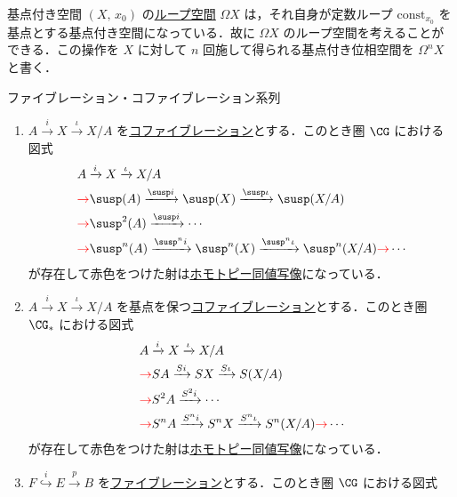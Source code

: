 \documentclass[algtopo_main]{subfiles}
\begin{document}
基点付き空間 $(X,\, x_0)$ の\hyperref[def:path-loop]{ループ空間} $\Omega X$ は，それ自身が定数ループ $\mathrm{const}_{x_0}$ を基点とする基点付き空間になっている．故に $\Omega X$ のループ空間を考えることができる．この操作を $X$ に対して $n$ 回施して得られる基点付き位相空間を $\Omega^n X$ と書く．

\begin{mytheo}[label=thm:fib-seq, breakable]{ファイブレーション・コファイブレーション系列}
    \begin{enumerate}
        \item $A \xrightarrow{i} X \xrightarrow{\iota} X/A$ を\hyperref[def:cofibration]{コファイブレーション}とする．このとき圏 $\CG$ における図式
        \begin{align}
            &A \xrightarrow{i} X \xrightarrow{\iota} X/A \\
            &\textcolor{red}{\to} \susp(A)  \xrightarrow{\susp i} \susp(X) \xrightarrow{\susp \iota} \susp (X/A) \\
            &\textcolor{red}{\to} \susp^2(A) \xrightarrow{\susp i} \cdots \\
            &\textcolor{red}{\to} \susp^n (A) \xrightarrow{\susp^n i} \susp^n (X) \xrightarrow{\susp^n \iota} \susp^n (X/A) \textcolor{red}{\to} \cdots 
        \end{align}
        が存在して赤色をつけた射は\hyperref[def:homotopy-basic]{ホモトピー同値写像}になっている．
        \item $A \xrightarrow{i} X \xrightarrow{\iota} X/A$ を基点を保つ\hyperref[def:cofibration]{コファイブレーション}とする．このとき圏 $\CG_*$ における図式
        \begin{align}
            &A \xrightarrow{i} X \xrightarrow{\iota} X/A \\
            &\textcolor{red}{\to} SA  \xrightarrow{S i} SX \xrightarrow{S \iota} S (X/A) \\
            &\textcolor{red}{\to} S^2A \xrightarrow{S^2 i} \cdots \\
            &\textcolor{red}{\to} S^n A \xrightarrow{S^n i} S^n X \xrightarrow{S^n \iota} S^n (X/A) \textcolor{red}{\to} \cdots 
        \end{align}
        が存在して赤色をつけた射は\hyperref[def:homotopy-basic]{ホモトピー同値写像}になっている．
        \item $F \stackrel{i}{\hookrightarrow} E \xrightarrow{p} B $ を\hyperref[def:fibration]{ファイブレーション}とする．このとき圏 $\CG$ における図式
        \begin{align}

\end{align}
\end{enumerate}
\end{mytheo}
\end{document}
